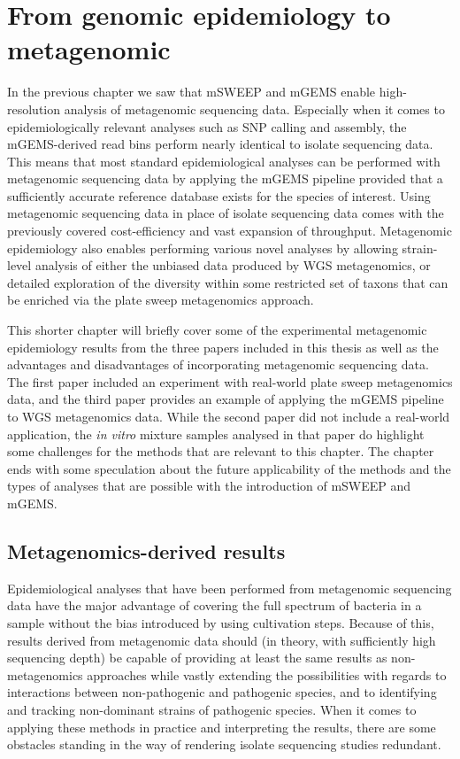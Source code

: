 \documentclass[officiallayout]{tktla}
\begin{document}
\section{From genomic epidemiology to metagenomic}

In the previous chapter we saw that mSWEEP and mGEMS enable
high-resolution analysis of metagenomic sequencing data. Especially
when it comes to epidemiologically relevant analyses such as SNP
calling and assembly, the mGEMS-derived read bins perform nearly
identical to isolate sequencing data. This means that most standard
epidemiological analyses can be performed with metagenomic sequencing
data by applying the mGEMS pipeline \textemdash{ } provided that a
sufficiently accurate reference database exists for the species of
interest. Using metagenomic sequencing data in place of isolate
sequencing data comes with the previously covered cost-efficiency and
vast expansion of throughput. Metagenomic epidemiology also enables
performing various novel analyses by allowing strain-level analysis of
either the unbiased data produced by WGS metagenomics, or detailed
exploration of the diversity within some restricted set of taxons that
can be enriched via the plate sweep metagenomics approach.

This shorter chapter will briefly cover some of the experimental metagenomic
epidemiology results from the three papers included in this thesis as
well as the advantages and disadvantages of incorporating metagenomic
sequencing data. The first paper included an experiment with
real-world plate sweep metagenomics data, and the third paper provides
an example of applying the mGEMS pipeline to WGS metagenomics
data. While the second paper did not include a real-world application,
the \textit{in vitro} mixture samples analysed in that paper do
highlight some challenges for the methods that are relevant to this
chapter. The chapter ends with some speculation about the future
applicability of the methods and the types of analyses that are
possible with the introduction of mSWEEP and mGEMS.

\subsection{Metagenomics-derived results}

Epidemiological analyses that have been performed from metagenomic
sequencing data have the major advantage of covering the full spectrum
of bacteria in a sample without the bias introduced by using
cultivation steps. Because of this, results derived from metagenomic
data should (in theory, with sufficiently high sequencing depth) be
capable of providing at least the same results as non-metagenomics
approaches while vastly extending the possibilities with regards to
interactions between non-pathogenic and pathogenic species, and to
identifying and tracking non-dominant strains of pathogenic
species. When it comes to applying these methods in practice and
interpreting the results, there are some obstacles standing in the way
of rendering isolate sequencing studies redundant.
\end{document}
